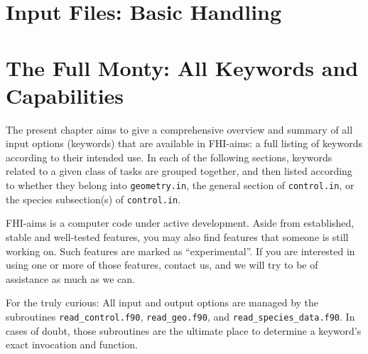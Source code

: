\documentclass[12pt,a4paper,twoside,openany,titlepage,final]{book}
\begin{document}
\newpage

\tableofcontents





\chapter{Input Files: Basic Handling}
\label{Ch:basic}












\chapter{The Full Monty: All Keywords and Capabilities}
\label{Ch:full}

The present chapter aims to give a comprehensive overview and summary of all
input options (keywords) that are available in FHI-aims: a full listing of
keywords according to their intended use. In each of the following
sections, keywords related to a 
given class of tasks are grouped together, and then listed according
to whether they belong into \texttt{geometry.in}, the general section
of \texttt{control.in}, or the species subsection(s) of
\texttt{control.in}.  

FHI-aims is a computer
code under active development. Aside from established, stable and well-tested
features, you may also find features that someone is still working on. Such
features are marked as ``experimental''. If you are interested in using one or
more of those features, contact us, and we will try to be of assistance as
much as we can.

For the truly curious: All input and output options are managed by the
subroutines \texttt{read\_control.f90}, \texttt{read\_geo.f90}, and
\texttt{read\_species\_data.f90}. In cases of doubt, those subroutines
are the ultimate place to determine a keyword's exact invocation and
function.









\end{document}
